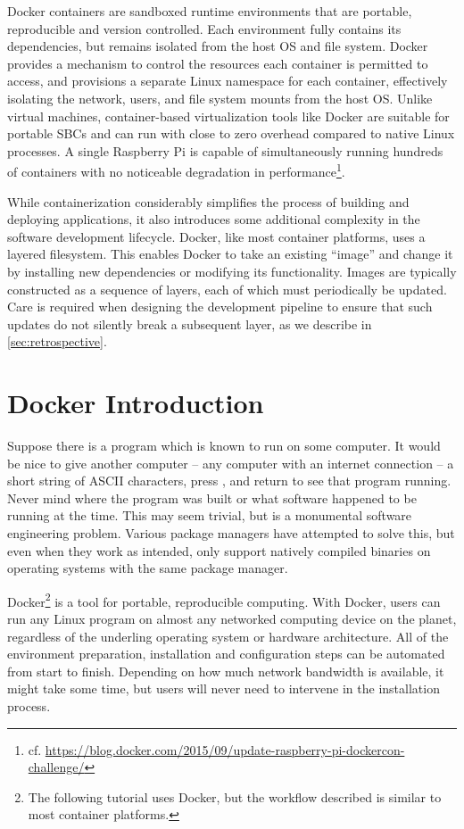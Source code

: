 \documentclass[12pt,initial,twoside,maitrise]{dms}
\numberwithin{equation}{section}
\numberwithin{table}{chapter}
\numberwithin{figure}{chapter}
\begin{document}
Docker containers are sandboxed runtime environments that are portable, reproducible and version controlled. Each environment fully contains its dependencies, but remains isolated from the host OS and file system. Docker provides a mechanism to control the resources each container is permitted to access, and provisions a separate Linux namespace for each container, effectively isolating the network, users, and file system mounts from the host OS. Unlike virtual machines, container-based virtualization tools like Docker are suitable for portable SBCs and can run with close to zero overhead compared to native Linux processes. A single Raspberry Pi is capable of simultaneously running hundreds of containers with no noticeable degradation in performance\footnote{cf. \url{https://blog.docker.com/2015/09/update-raspberry-pi-dockercon-challenge/}}.

While containerization considerably simplifies the process of building and deploying applications, it also introduces some additional complexity in the software development lifecycle. Docker, like most container platforms, uses a layered filesystem. This enables Docker to take an existing ``image'' and change it by installing new dependencies or modifying its functionality. Images are typically constructed as a sequence of layers, each of which must periodically be updated. Care is required when designing the development pipeline to ensure that such updates do not silently break a subsequent layer, as we describe in \autoref{sec:retrospective}.

\section{Docker Introduction}\label{sec:docker-intro}

Suppose there is a program which is known to run on some computer. It would be nice to give another computer -- any computer with an internet connection -- a short string of ASCII characters, press \keys{\return}, and return to see that program running. Never mind where the program was built or what software happened to be running at the time. This may seem trivial, but is a monumental software engineering problem. Various package managers have attempted to solve this, but even when they work as intended, only support natively compiled binaries on operating systems with the same package manager.

Docker\footnote{The following tutorial uses Docker, but the workflow described is similar to most container platforms.} is a tool for portable, reproducible computing. With Docker, users can run any Linux program on almost any networked computing device on the planet, regardless of the underling operating system or hardware architecture. All of the environment preparation, installation and configuration steps can be automated from start to finish. Depending on how much network bandwidth is available, it might take some time, but users will never need to intervene in the installation process.
\end{document}
